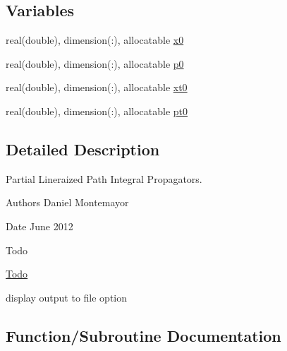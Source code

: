 \subsection*{Variables}
\begin{DoxyCompactItemize}
\item 
real(double), dimension(\+:), allocatable \hyperlink{namespacepldm__class_a66ae11e24219b080698059a797561bb4}{x0}
\item 
real(double), dimension(\+:), allocatable \hyperlink{namespacepldm__class_a4da9c01c7e463087a5f38764804dd0eb}{p0}
\item 
real(double), dimension(\+:), allocatable \hyperlink{namespacepldm__class_a2f8d09296fcb6d486fb5a87e5a13276b}{xt0}
\item 
real(double), dimension(\+:), allocatable \hyperlink{namespacepldm__class_a6f0729e807a28fab99053667439c375c}{pt0}
\end{DoxyCompactItemize}


\subsection{Detailed Description}
Partial Lineraized Path Integral Propagators. 

\begin{DoxyAuthor}{Authors}
Daniel Montemayor 
\end{DoxyAuthor}
\begin{DoxyDate}{Date}
June 2012 
\end{DoxyDate}
\begin{DoxyRefDesc}{Todo}
\item[\hyperlink{todo__todo000003}{Todo}]
\begin{DoxyItemize}
\item display output to file option 
\end{DoxyItemize}\end{DoxyRefDesc}


\subsection{Function/\+Subroutine Documentation}
\mbox{\label{namespacepldm__class_a56bc2a02f61ba7f0ef59c429a9f1e038}} 
